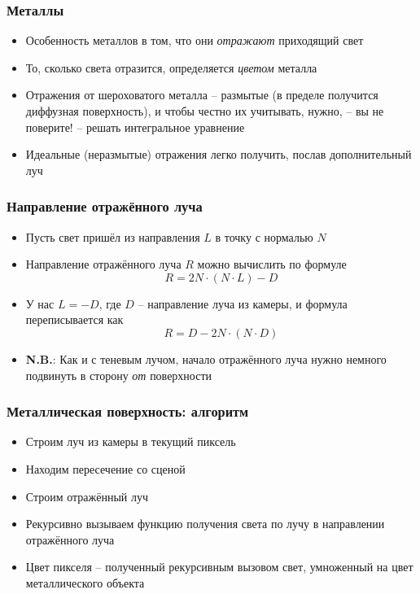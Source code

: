 \documentclass[10pt,handout]{beamer}
\begin{document}
\begin{frame}[fragile]
\frametitle{Металлы}
\begin{itemize}
\item Особенность металлов в том, что они \textit{отражают} приходящий свет
\pause
\item То, сколько света отразится, определяется \textit{цветом} металла
\pause
\item Отражения от шероховатого металла -- размытые (в пределе получится диффузная поверхность), и чтобы честно их учитывать, нужно, -- вы не поверите! -- решать интегральное уравнение
\pause
\item Идеальные (неразмытые) отражения легко получить, послав дополнительный луч
\end{itemize}
\end{frame}

\begin{frame}[fragile]
\frametitle{Направление отражённого луча}
\begin{itemize}
\item Пусть свет пришёл из направления \begin{math}L\end{math} в точку с нормалью \begin{math}N\end{math}
\pause
\item Направление отражённого луча \begin{math}R\end{math} можно вычислить по формуле 
\begin{equation*}
R = 2N\cdot(N \cdot L) - D
\end{equation*}
\pause
\item У нас \begin{math}L=-D\end{math}, где \begin{math}D\end{math} -- направление луча из камеры, и формула переписывается как
\begin{equation*}
R = D - 2N\cdot(N \cdot D)
\end{equation*}
\pause
\item \alert{\textbf{N.B.}}: Как и с теневым лучом, начало отражённого луча нужно немного подвинуть в сторону \textit{от} поверхности
\end{itemize}
\end{frame}

\begin{frame}[fragile]
\frametitle{Металлическая поверхность: алгоритм}
\begin{itemize}
\item Строим луч из камеры в текущий пиксель
\pause
\item Находим пересечение со сценой
\pause
\item Строим отражённый луч
\pause
\item Рекурсивно вызываем функцию получения света по лучу в направлении отражённого луча
\pause
\item Цвет пикселя -- полученный рекурсивным вызовом свет, умноженный на цвет металлического объекта
\end{itemize}
\end{frame}
\end{document}
